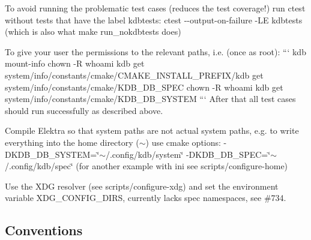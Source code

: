 \begin{DoxyEnumerate}
\item To avoid running the problematic test cases (reduces the test coverage!) run {\ttfamily ctest} without tests that have the label {\ttfamily kdbtests}\+: {\ttfamily ctest -\/-\/output-\/on-\/failure -\/\+LE kdbtests} (which is also what {\ttfamily make run\+\_\+nokdbtests} does)
\item To give your user the permissions to the relevant paths, i.\+e. (once as root)\+: ``` kdb mount-\/info chown -\/R {\ttfamily whoami} {\ttfamily kdb get system/info/constants/cmake/\+C\+M\+A\+K\+E\+\_\+\+I\+N\+S\+T\+A\+L\+L\+\_\+\+P\+R\+E\+F\+IX}/{\ttfamily kdb get system/info/constants/cmake/\+K\+D\+B\+\_\+\+D\+B\+\_\+\+S\+P\+EC} chown -\/R {\ttfamily whoami} {\ttfamily kdb get system/info/constants/cmake/\+K\+D\+B\+\_\+\+D\+B\+\_\+\+S\+Y\+S\+T\+EM} ``` After that all test cases should run successfully as described above.
\item Compile Elektra so that system paths are not actual system paths, e.\+g. to write everything into the home directory ({\ttfamily $\sim$}) use cmake options\+: {\ttfamily -\/\+D\+K\+D\+B\+\_\+\+D\+B\+\_\+\+S\+Y\+S\+T\+EM=\char`\"{}$\sim$/.\+config/kdb/system\char`\"{} -\/\+D\+K\+D\+B\+\_\+\+D\+B\+\_\+\+S\+P\+EC=\char`\"{}$\sim$/.\+config/kdb/spec\char`\"{}} (for another example with ini see {\ttfamily scripts/configure-\/home})
\item Use the X\+DG resolver (see {\ttfamily scripts/configure-\/xdg}) and set the environment variable {\ttfamily X\+D\+G\+\_\+\+C\+O\+N\+F\+I\+G\+\_\+\+D\+I\+RS}, currently lacks {\ttfamily spec} namespaces, see \#734.
\end{DoxyEnumerate}

\subsection*{Conventions}


